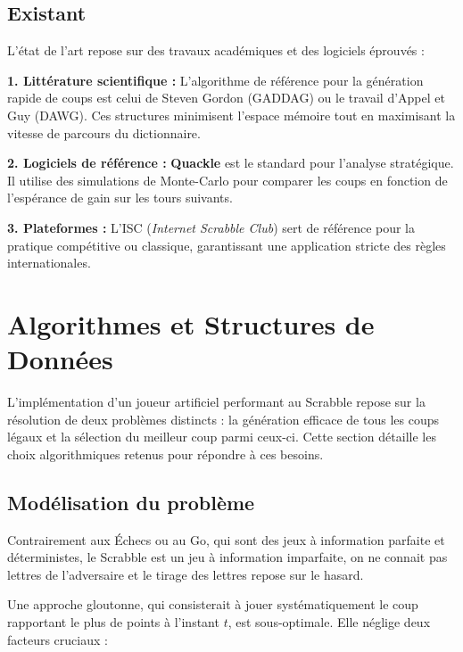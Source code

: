 \documentclass[a4paper]{article}
\begin{document}
\subsection{Existant}
\hangindent=0.8mm
L'état de l'art repose sur des travaux académiques et des logiciels éprouvés :

\hangindent=1.5cm
\textbf{1. Littérature scientifique :} L'algorithme de référence pour la génération rapide de coups est celui de Steven Gordon (GADDAG) ou le travail d'Appel et Guy (DAWG). Ces structures minimisent l'espace mémoire tout en maximisant la vitesse de parcours du dictionnaire.

\vspace{1\baselineskip}
\hangindent=1.5cm
\textbf{2. Logiciels de référence :} \textbf{Quackle} est le standard pour l'analyse stratégique. Il utilise des simulations de Monte-Carlo pour comparer les coups en fonction de l'espérance de gain sur les tours suivants.

\vspace{1\baselineskip}
\hangindent=1.5cm
\textbf{3. Plateformes :} L'ISC (\textit{Internet Scrabble Club}) sert de référence pour la pratique compétitive ou classique, garantissant une application stricte des règles internationales.

\section{Algorithmes et Structures de Données}
\hangindent=0.8mm
L'implémentation d'un joueur artificiel performant au Scrabble repose sur la résolution de deux problèmes distincts : la génération efficace de tous les coups légaux et la sélection du meilleur coup parmi ceux-ci. Cette section détaille les choix algorithmiques retenus pour répondre à ces besoins.

\subsection{Modélisation du problème}
\hangindent=0.8mm
Contrairement aux Échecs ou au Go, qui sont des jeux à information parfaite et déterministes, le Scrabble est un jeu à information imparfaite, on ne connait pas lettres de l'adversaire et le tirage des lettres repose sur le hasard.

\hangindent=0.8mm
Une approche gloutonne, qui consisterait à jouer systématiquement le coup rapportant le plus de points à l'instant $t$, est sous-optimale. Elle néglige deux facteurs cruciaux :
\end{document}
